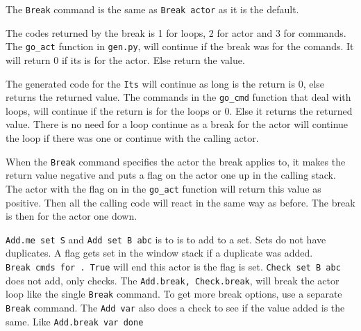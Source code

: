 The \texttt{Break} command is the same as \texttt{Break\ actor} as it is
the default.

The codes returned by the break is 1 for loops, 2 for actor and 3 for
commands. The \texttt{go\_act} function in \texttt{gen.py}, will
continue if the break was for the comands. It will return 0 if its is
for the actor. Else return the value.

The generated code for the \texttt{Its} will continue as long is the
return is 0, else returns the returned value. The commands in the
\texttt{go\_cmd} function that deal with loops, will continue if the
return is for the loops or 0. Else it returns the returned value. There
is no need for a loop continue as a break for the actor will continue
the loop if there was one or continue with the calling actor.

When the \texttt{Break} command specifies the actor the break applies
to, it makes the return value negative and puts a flag on the actor one
up in the calling stack. The actor with the flag on in the
\texttt{go\_act} function will return this value as positive. Then all
the calling code will react in the same way as before. The break is then
for the actor one down.

\texttt{Add.me\ set\ S} and \texttt{Add\ set\ B\ abc} is to is to add to
a set. Sets do not have duplicates. A flag gets set in the window stack
if a duplicate was added. \texttt{Break\ cmds\ for\ .\ True} will end
this actor is the flag is set. \texttt{Check\ set\ B\ abc} does not add,
only checks. The \texttt{Add.break,\ Check.break}, will break the actor
loop like the single \texttt{Break} command. To get more break options,
use a separate \texttt{Break} command. The \texttt{Add\ var} also does a
check to see if the value added is the same. Like
\texttt{Add.break\ var\ done}
